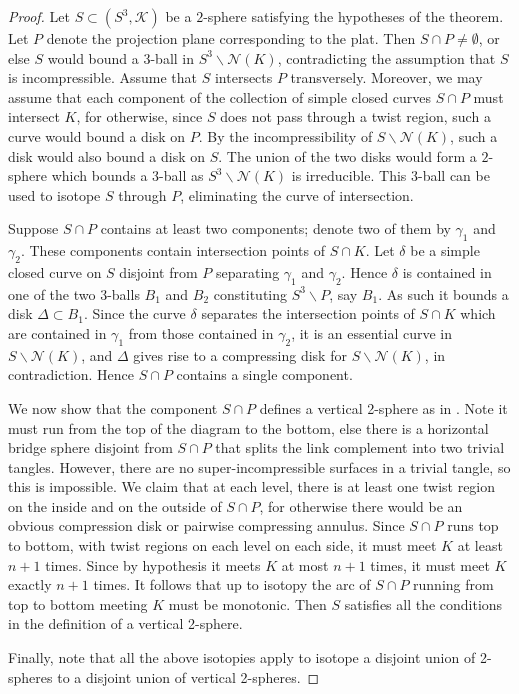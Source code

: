 \documentclass[12pt,reqno]{amsart}
\theoremstyle{plain}
\theoremstyle{definition}
\newcommand{\NN}{\mathcal{N}}
\newcommand{\ssm}{\smallsetminus}
\begin{document}
\begin{proof} 
Let $S \subset (S^3, \mathcal{K})$ be a $2$-sphere satisfying the hypotheses of the 
theorem. Let $P$ denote the projection plane corresponding to the plat. Then 
$S\cap P \neq \emptyset$, or else $S$ would bound a 3-ball in $S^3\ssm \NN(K)$,
contradicting the assumption that $S$ is incompressible. 
Assume that $S$ intersects $P$ transversely. Moreover, we may assume that 
each component of the collection of simple closed curves $S\cap P$ must intersect 
$K$, for otherwise, since $S$ does not pass through a twist region, such a curve 
would bound a disk on $P$. By the incompressibility of $S\ssm \NN(K)$, 
such a disk would also bound a disk on $S$. The union of the two disks would 
form a $2$-sphere which bounds a 3-ball as $S^3\ssm \NN(K)$ is irreducible.
This $3$-ball can be used to isotope $S$ through $P$, eliminating the curve 
of intersection. 

Suppose $S\cap P$ contains at least two components; denote two of them by
$\gamma_1$ and $\gamma_2$. These components contain intersection points 
of $S \cap K$. Let $\delta$ be a simple closed curve on $S$ disjoint from 
$P$ separating $\gamma_1$ and $\gamma_2$. Hence $\delta$ is contained in 
one of the two $3$-balls $B_1$ and $B_2$ constituting $S^3 \ssm P$, say 
$B_1$. As such it bounds a disk $\Delta \subset B_1$. Since the curve 
$\delta$ separates the intersection points of $S \cap K$ which are contained 
in $\gamma_1$ from those contained in $\gamma_2$, it is an essential 
curve in $S \ssm \NN(K)$, and $\Delta$ gives rise to a compressing disk 
for $S \ssm \NN(K)$, in contradiction. Hence $S\cap P$ contains a single 
component.

We now show that the component $S\cap P$ defines a vertical 2-sphere as in
. Note it must run from the top of the diagram 
to the bottom, else there is a horizontal bridge sphere disjoint from $S\cap P$
that splits the link complement into two trivial tangles. However, there are no
super-incompressible surfaces in a trivial tangle, so this is impossible. 
We claim that at each level, there is at least one twist region on the inside 
and on the outside of $S\cap P$, for otherwise there would be an obvious
compression disk or pairwise compressing annulus. Since $S\cap P$ runs top to
bottom, with twist regions on each level on each side, it must meet $K$ at 
least $n+1$ times. Since by hypothesis it meets $K$ at most $n+1$ times, it must 
meet $K$ exactly $n+1$ times. It follows that up to isotopy the arc of $S\cap P$ 
running from top to bottom meeting $K$ must be monotonic. Then $S$ satisfies 
all the conditions in the definition of a vertical 2-sphere. 

Finally, note that all the above isotopies apply to isotope a disjoint 
union of 2-spheres to a disjoint union of vertical 2-spheres.
\end{proof}
\end{document}
